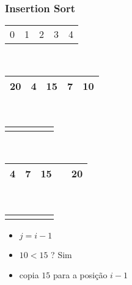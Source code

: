 \documentclass{beamer}
\begin{document}
\begin{frame}
    \frametitle{Insertion Sort}
    \begin{center}
        \begin{table}
            \begin{tabular}{p{0.25cm} p{0.25cm} p{0.25cm} p{0.25cm} p{0.25cm}}
                0 & 1 & 2 & 3 & 4
            \end{tabular} \\
            \begin{tabular}{| p{0.25cm} | p{0.25cm} | p{0.25cm} | p{0.25cm} | p{0.25cm} |}
                \hline
                20 & 4 & 15 & 7 & 10 \\ \hline
            \end{tabular} \\
            \begin{tabular}{p{0.25cm} p{0.25cm} p{0.25cm} p{0.25cm} p{0.25cm}}
                & & & & \color{green}{$\uparrow$}
            \end{tabular} \\
            \begin{tabular}{| p{0.25cm} | p{0.25cm} | p{0.25cm} | p{0.25cm} | p{0.25cm} |}
                \hline
                4 & 7 & 15 &  & 20 \\ \hline
            \end{tabular} \\
            \begin{tabular}{p{0.25cm} p{0.25cm} p{0.25cm} p{0.25cm} p{0.25cm}}
                & & \color{red}{$\uparrow$} & \color{blue}{$\uparrow$} &
            \end{tabular}
        \end{table}
	\end{center}
    \color{green}{$ordenando = 10$}
    \begin{itemize}[<+->]
        \item $j = i - 1$
        \item $10 < 15$ ? Sim
        \item copia $15$ para a posição $i - 1$
    \end{itemize}
\end{frame}
\end{document}
